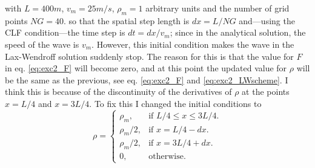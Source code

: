 with $L=400 m$, $v_m= 25m/s$, $\rho_m=1$ arbitrary units and the number of grid points $NG=40$.
so that the spatial step length is $dx = L/NG$ and---using the CLF condition---the time step is $dt=dx/v_m$; 
since in the analytical solution, the speed of the wave is $v_m$. 
However, this initial condition makes the wave in the Lax-Wendroff solution suddenly stop. The reason
for this is that the value for $F$ in eq. \ref{eq:exc2_F} will become zero, and at this point the updated value for $\rho$ will be the same as the previous, see eq. \ref{eq:exc2_F} and \ref{eq:exc2_LWscheme}.
I think this is because of the discontinuity of the derivatives of $\rho$ at the points $x=L/4$
and $x=3L/4$. To fix this I changed the initial conditions to
\begin{equation}
\rho = 
	\begin{cases}
    	\rho_m, & \text{if $L/4 \le x \le 3L/4$}.\\
    	\rho_m/2, & \text{if $x = L/4-dx$}.\\
    	\rho_m/2, & \text{if $x = 3L/4+dx$}.\\
    	0, 		& \text{otherwise}.
  	\end{cases}
\end{equation}

